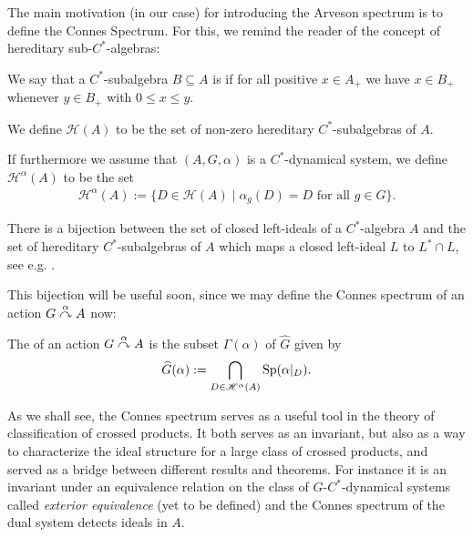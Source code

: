 The main motivation (in our case) for introducing the Arveson spectrum is to define the Connes Spectrum. For this, we remind the reader of the concept of hereditary sub-$C^*$-algebras:
\begin{definition}
	We say that a $C^*$-subalgebra $B\subseteq A$ is  if for all positive $x \in A_+$ we have $x \in B_+$ whenever $y \in B_+$ with $0 \leq x \leq y$. 
	
	We define $\mathscr{H}(A)$ to be the set of non-zero hereditary $C^*$-subalgebras of $A$. 
	
	If furthermore we assume that $(A, G, \alpha)$ is a $C^*$-dynamical system, we define $\mathscr{H}^\alpha(A)$ to be the set
	\begin{align*}
		\mathscr{H}^\alpha (A) := \{ D \in \mathscr{H}(A) \mid \alpha_g(D)=D \text{ for all } g \in G\}.
	\end{align*}
\end{definition}
\begin{remark}
	There is a bijection between the set of closed left-ideals of a $C^*$-algebra $A$ and the set of hereditary $C^*$-subalgebras of $A$ which maps a closed left-ideal $L$ to $L^* \cap L$, see e.g. \cite[II.5.3.2]{blackadar}.
\end{remark}
This bijection will be useful soon, since we may define the Connes spectrum of an action $G \stackrel{\alpha}{\curvearrowright} A$ now:
\begin{definition}
	The  of an action $G \stackrel{\alpha}{\curvearrowright} A$ is the subset $\Gamma(\alpha)$ of $\hat G$ given by
	\begin{align*}
		\widehat{G} ( \alpha) := \bigcap_{D \in \mathscr{H}^\alpha (A)} \mathrm{Sp}(\alpha|_D).
	\end{align*}
\end{definition}
As we shall see, the Connes spectrum serves as a useful tool in the theory of classification of crossed products. It both serves as an invariant, but also as a way to characterize the ideal structure for a large class of crossed products, and served as a bridge between different results and theorems. For instance it is an invariant under an equivalence relation on the class of $G$-$C^*$-dynamical systems called \textit{exterior equivalence} (yet to be defined) and the Connes spectrum of the dual system detects ideals in $A$. 

